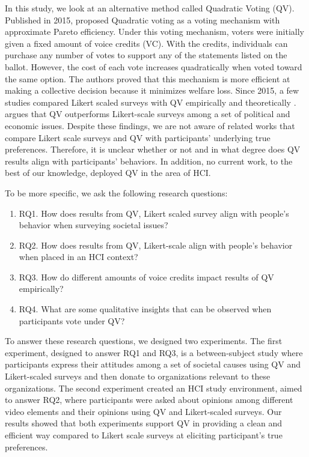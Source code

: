 In this study, 
we look at an alternative method
called Quadratic Voting (QV).
Published in 2015,
\textcite{posner2018radical}
proposed Quadratic voting
as a voting mechanism 
with approximate Pareto efficiency.
Under this voting mechanism,
voters were initially given 
a fixed amount of voice credits (VC).
With the credits, 
individuals can purchase 
any number of votes to support any of the statements
listed on the ballot.
However, the cost of each vote 
increases quadratically 
when voted toward the same option.
The authors proved that this 
mechanism is more efficient 
at making a collective decision 
because it minimizes welfare loss.
Since 2015, a few studies
compared Likert scaled surveys with QV 
empirically and theoretically
\cite{quarfoot2017quadratic, naylor2017first}.
\textcite{cavaille2018towards} argues that 
QV outperforms Likert-scale surveys 
among a set of political and economic issues.
Despite these findings,
we are not aware of related works that
compare Likert scale surveys and QV
with participants' underlying true preferences.
Therefore, it is unclear whether or not
and in what degree
does QV results align with participants' behaviors.
In addition, 
no current work, to the best of our knowledge,
deployed QV in the area of HCI.

To be more specific, 
we ask the following research questions:
\begin{enumerate}[label={},leftmargin=\parindent]
    \item RQ1. How does results from 
               QV, Likert scaled survey
               align with people's behavior 
               when surveying societal issues?
    \item RQ2. How does results from 
               QV, Likert-scale 
               align with people's behavior 
               when placed in an HCI context?
    \item RQ3. How do different amounts of
               voice credits impact results of QV empirically?
    \item RQ4. What are some qualitative insights that can be observed
               when participants vote under QV?
\end{enumerate}
To answer these research questions,
we designed two experiments.
The first experiment,
designed to answer RQ1 and RQ3,
is a between-subject study
where participants express their attitudes
among a set of societal causes using 
QV and Likert-scaled surveys
and then donate
to organizations relevant to these organizations.
The second experiment 
created an HCI study environment,
aimed to answer RQ2,
where participants were asked about 
opinions among different video elements
and their opinions using QV and Likert-scaled surveys.
Our results showed that both experiments support
QV in providing a clean and efficient way
compared to Likert scale surveys
at eliciting participant's true preferences.

